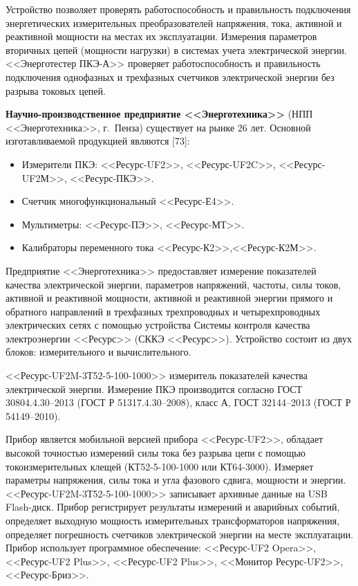 Устройство позволяет проверять работоспособность и правильность подключения энергетических измерительных преобразователей напряжения, тока, активной и реактивной мощности на местах их эксплуатации. Измерения параметров вторичных цепей (мощности нагрузки) в системах учета электрической энергии. <<Энерготестер ПКЭ-А>>  проверяет работоспособность и правильность подключения однофазных и трехфазных счетчиков электрической энергии без разрыва токовых цепей.

\textbf{Научно-производственное предприятие <<Энерготехника>>}  (НПП <<Энерготехника>>, г.~Пенза) существует на рынке 26 лет. Основной изготавливаемой продукцией являются [73]: 

\begin{itemize}
	\item Измерители ПКЭ: <<Ресурс-UF2>>, <<Ресурс-UF2C>>, <<Ресурс-UF2М>>, <<Ресурс-ПКЭ>>.
	\item Счетчик многофункциональный <<Ресурс-Е4>>.
	\item Мультиметры: <<Ресурс-ПЭ>>, <<Ресурс-МТ>>.
	\item Калибраторы переменного тока <<Ресурс-К2>>,<<Ресурс-К2М>>.
\end{itemize}

Предприятие <<Энерготехника>> предоставляет измерение показателей качества электрической энергии, параметров напряжений, частоты, силы токов, активной и реактивной мощности, активной и реактивной энергии прямого и обратного направлений в трехфазных трехпроводных и четырехпроводных электрических сетях с помощью устройства Системы контроля качества электроэнергии <<Ресурс>> (СККЭ <<Ресурс>>). Устройство состоит из двух блоков: измерительного и  вычислительного.

<<Ресурс-UF2M-3Т52-5-100-1000>> измеритель показателей качества электрической энергии. Измерение ПКЭ производится согласно ГОСТ 30804.4.30–2013 \cite{ГОСТ30804.4.30-2013} (ГОСТ Р 51317.4.30–2008), класс А, ГОСТ 32144–2013 \cite{ГОСТ32144-2013} (ГОСТ Р 54149–2010). 

Прибор является мобильной версией прибора <<Ресурс‑UF2>>, обладает высокой точностью измерений силы тока без разрыва цепи с помощью токоизмерительных клещей (КТ52-5-100-1000 или КТ64-3000). Измеряет параметры напряжения, силы тока и угла фазового сдвига, мощности и энергии. <<Ресурс-UF2M-3Т52-5-100-1000>> записывает архивные данные на USB Flash-диск. Прибор регистрирует результаты измерений и аварийных событий, определяет выходную мощность измерительных трансформаторов напряжения, определяет погрешность счетчиков электрической энергии на месте эксплуатации. Прибор использует программное обеспечение: <<Ресурс-UF2 Opera>>, <<Ресурс-UF2 Plus>>, <<Ресурс-UF2 Plus>>, <<Монитор Ресурс-UF2>>, <<Ресурс-Бриз>>. 

